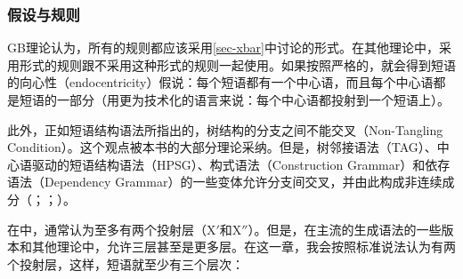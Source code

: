 \subsubsection{假设与规则}

GB理论认为，所有的规则都应该采用\ref{sec-xbar}中讨论的\xbarc 形式。在其他理论中，采用\xbarc 形式的规则跟不采用这种形式的规则一起使用。如果按照严格的\xbartc，就会得到短语的向心性（endocentricity）假说：每个短语都有一个中心语，而且每个中心语都是短语的一部分（用更为技术化的语言来说：每个中心语都投射到一个短语上）。

此外，正如短语结构语法所指出的，树结构的分支之间不能交叉（Non-Tangling Condition）。这个观点被本书的大部分理论采纳。但是，树邻接语法\indextagc（TAG）、中心语驱动的短语结构语法\indexhpsgc（HPSG）、构式语法\indexcxgc（Construction Grammar）和依存语法\indexdgc （Dependency Grammar）的一些变体允许分支间交叉，并由此构成非连续成分（\citealp*{BJR91a,Reape94a,BC2005a}；\citealp[]{Heringer96a-u}；\citealp[\S~9.6.2]{Eroms2000a}）。

在\xbartc 中，通常认为至多有两个投射层（X$'$和X$''$）。但是，在主流的生成语法的一些版本和其他理论中，允许三层甚至是更多层\citep{Jackendoff77a,Uszkoreit87a}。在这一章，我会按照标准说法认为有两个投射层，这样，短语就至少有三个层次：

